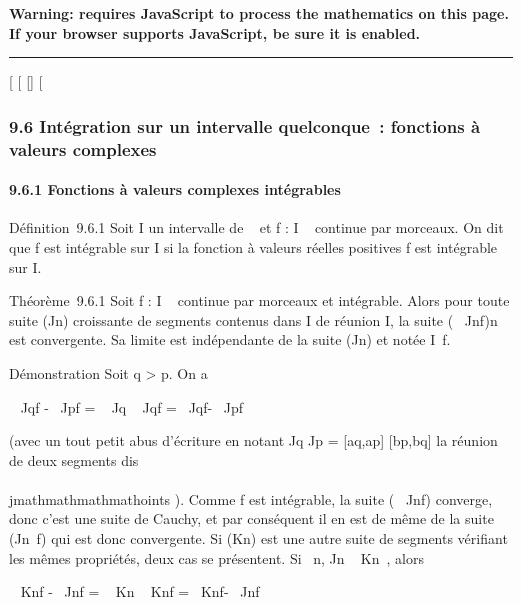 \textbf{Warning: 
requires JavaScript to process the mathematics on this page.\\ If your
browser supports JavaScript, be sure it is enabled.}

\begin{center}\rule{3in}{0.4pt}\end{center}

{[}
{[}
{[}{]}
{[}

\subsubsection{9.6 Intégration sur un intervalle quelconque~: fonctions
à valeurs complexes}

\paragraph{9.6.1 Fonctions à valeurs complexes intégrables}

Définition~9.6.1 Soit I un intervalle de ~ et f : I \rightarrow~  continue par
morceaux. On dit que f est intégrable sur I si la fonction à valeurs
réelles positives \textbar{}f\textbar{} est intégrable sur I.

Théorème~9.6.1 Soit f : I \rightarrow~  continue par morceaux et intégrable. Alors
pour toute suite (Jn) croissante de segments contenus dans I
de réunion I, la suite (\int ~
Jnf)n\in{}~ est convergente. Sa limite est
indépendante de la suite (Jn) et notée
\int  I~f.

Démonstration Soit q \textgreater{} p. On a

\left \textbar{}\int ~
Jqf -\int ~
Jpf\right \textbar{} =
\left \textbar{}\int ~
Jq\diagdownJpf\right
\textbar{}\leq\int ~
Jq\diagdownJp\textbar{}f\textbar{}
=\int ~
Jq\textbar{}f\textbar{}-\int ~
Jp\textbar{}f\textbar{}

(avec un tout petit abus d'écriture en notant Jq \diagdown
Jp = {[}aq,ap{]} \cup
{[}bp,bq{]} la réunion de deux segments dis\\\\jmathmathmathmathoints ).
Comme \textbar{}f\textbar{} est intégrable, la suite
(\int ~
Jn\textbar{}f\textbar{}) converge, donc c'est une
suite de Cauchy, et par conséquent il en est de même de la suite
(\int  Jn~f) qui est donc
convergente. Si (Kn) est une autre suite de segments vérifiant
les mêmes propriétés, deux cas se présentent. Si
\forall~n, Jn \subset~ Kn~, alors

\left \textbar{}\int ~
Knf -\int ~
Jnf\right \textbar{} =
\left \textbar{}\int ~
Kn\diagdownJnf\right
\textbar{}\leq\int ~
Kn\diagdownJn\textbar{}f\textbar{}
=\int ~
Kn\textbar{}f\textbar{}-\int ~
Jn\textbar{}f\textbar{}

